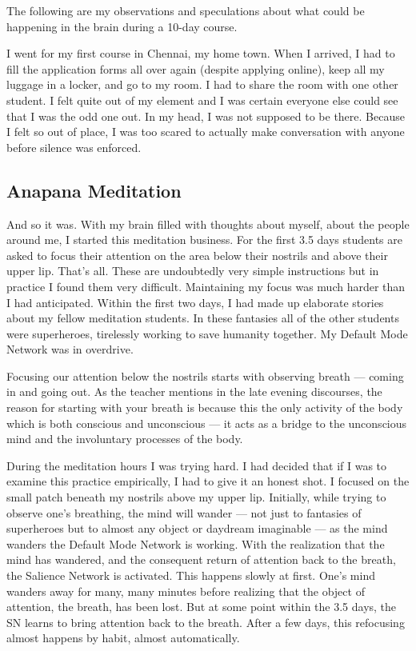 \documentclass[a4paper, amsfonts, amssymb, amsmath, reprint, showkeys, nofootinbib, twoside]{revtex4-1}
\begin{document}
The following are my observations and speculations about what could be happening
in the brain during a 10-day course.

I went for my first course in Chennai, my home town. When I arrived, I had to fill
the application forms all over again (despite applying online), keep all my
luggage in a locker, and go to my room. I had to share the room with one other
student. I felt quite out of my element and I was certain everyone else could see
that I was the odd one out. In my head, I was not supposed to be there. Because I felt
so out of place, I was too scared to actually make conversation with anyone before
silence was enforced.

\subsection{Anapana Meditation}

And so it was. With my brain filled with thoughts about myself, about the people
around me, I started this meditation business. For the first 3.5 days students are asked
to focus their attention on the area below their nostrils and above their upper
lip. That's all. These are undoubtedly very simple instructions but in practice I
found them very difficult. Maintaining my focus was much harder than I had
anticipated. Within the first two days, I had made up elaborate stories about my
fellow meditation students. In these fantasies all of the other students were
superheroes, tirelessly working to save humanity together. My Default Mode Network
was in overdrive.

Focusing our attention below the nostrils starts with observing breath --- coming in
and going out. As the teacher mentions in the late evening discourses, the reason for
starting with your breath is because this the only activity of the body which is both
conscious and unconscious --- it acts as a bridge to the unconscious mind and the
involuntary processes of the body.


During the meditation hours I was trying hard. I had decided that if I was to examine this practice
empirically, I had to give it an honest shot. I focused on the small patch beneath my
nostrils above my upper lip. Initially, while trying to observe one's breathing, the
mind will wander --- not just to fantasies of superheroes but to almost any object or
daydream imaginable --- as the mind wanders the Default Mode Network is working. With
the realization that the mind has wandered, and the consequent return of attention
back to the breath, the Salience Network is
activated. This happens slowly at first. One's mind wanders away for many, many
minutes before realizing that the object of attention, the breath, has been lost. But
at some point within the 3.5 days, the SN learns to bring attention back to the breath. After a few days, this
refocusing almost happens by habit, almost automatically.
\end{document}
